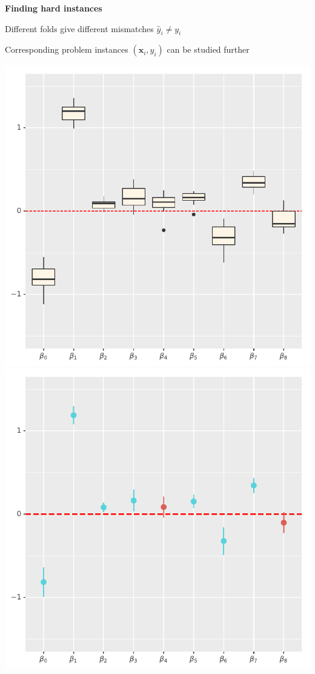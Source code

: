 \documentclass[landscape,footrule]{foils}
\renewcommand{\vec}[1]{\boldsymbol{#1}}
\begin{document}
\textbf{Finding hard instances}
\begin{triangles}
\item Different folds give different mismatches $\hat{y}_i\neq y_i$
\item Corresponding problem instances $(\vec{x}_i, y_i)$ can be studied further
\end{triangles}



\centerline{
\includegraphics[scale=0.8]{crossvalidation_parameter_variance_i}\hspace*{0.5cm}
\includegraphics[scale=0.8]{crossvalidation_parameter_variance_ii}}
\end{document}
